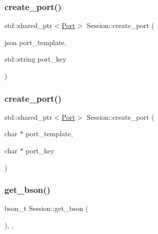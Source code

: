 \mbox{\label{class_session_abba77e16f30f13cb1b907066c672dd72}} 
\subsubsection{\texorpdfstring{create\+\_\+port()}{create\_port()}\hspace{0.1cm}{\footnotesize\ttfamily [1/2]}}
{\footnotesize\ttfamily std\+::shared\+\_\+ptr$<$\hyperlink{class_port}{Port}$>$ Session\+::create\+\_\+port (\begin{DoxyParamCaption}\item[{json}]{port\+\_\+template,  }\item[{std\+::string}]{port\+\_\+key }\end{DoxyParamCaption})}

\mbox{\label{class_session_ab9bee143899cc1eb3d3cf9dcb3652f99}} 
\subsubsection{\texorpdfstring{create\+\_\+port()}{create\_port()}\hspace{0.1cm}{\footnotesize\ttfamily [2/2]}}
{\footnotesize\ttfamily std\+::shared\+\_\+ptr$<$\hyperlink{class_port}{Port}$>$ Session\+::create\+\_\+port (\begin{DoxyParamCaption}\item[{char $\ast$}]{port\+\_\+template,  }\item[{char $\ast$}]{port\+\_\+key }\end{DoxyParamCaption})}

\mbox{\label{class_session_aa517fe6138a0cc32e27ddf1eb7331520}} 
\subsubsection{\texorpdfstring{get\+\_\+bson()}{get\_bson()}}
{\footnotesize\ttfamily bson\+\_\+t Session\+::get\+\_\+bson (\begin{DoxyParamCaption}{ }\end{DoxyParamCaption})\hspace{0.3cm}{\ttfamily [final]}, {\ttfamily [protected]}, {\ttfamily [virtual]}}



